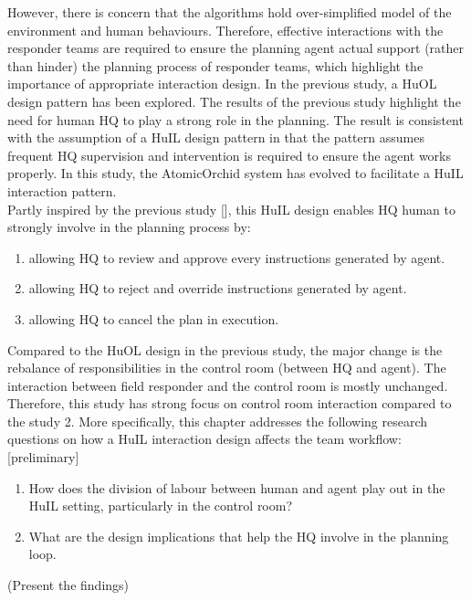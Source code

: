 However, there is concern that the algorithms hold over-simplified model of the environment and human behaviours. Therefore, effective interactions with the responder teams are required to ensure the planning agent actual support (rather than hinder) the planning process of responder teams, which highlight the importance of appropriate interaction design. In the previous study, a HuOL design pattern has been explored. The results of the previous study highlight the need for human HQ to play a strong role in the planning. The result is consistent with the assumption of a HuIL design pattern in that the pattern assumes frequent HQ supervision and intervention is required to ensure the agent works properly. In this study, the AtomicOrchid system has evolved to facilitate a HuIL interaction pattern.\\

Partly inspired by the previous study [], this HuIL design enables HQ human to strongly involve in the planning process by: 


\begin{enumerate}
	\item allowing HQ to review and approve every instructions generated by agent.
	\item allowing HQ to reject and override instructions generated by agent.
	\item allowing HQ to cancel the plan in execution. 
\end{enumerate}

Compared to the HuOL design in the previous study, the major change is the rebalance of responsibilities in the control room (between HQ and agent). The interaction between field responder and the control room is mostly unchanged. Therefore, this study has strong focus on control room interaction compared to the study 2. More specifically, this chapter addresses the following research questions on how a HuIL interaction design affects the team workflow: [preliminary]\\

\begin{enumerate}
 \item How does the division of labour between human and agent play out in the HuIL setting, particularly in the control room?\\
 \item What are the design implications that help the HQ involve in the planning loop. 
\end{enumerate}

(Present the findings)

